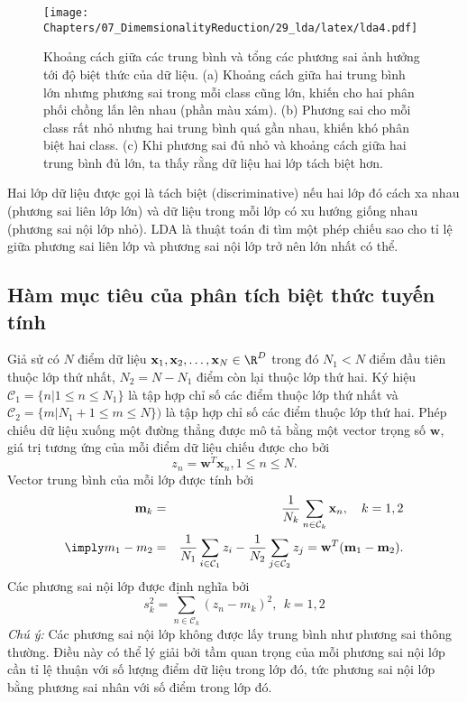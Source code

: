 \begin{figure}[t]
    \centering
        \texttt{[image: Chapters/07\_DimemsionalityReduction/29\_lda/latex/lda4.pdf]}
        \caption[]{Khoảng cách giữa các trung bình và tổng các phương sai ảnh hưởng
        tới độ biệt thức của dữ liệu. (a) Khoảng cách giữa hai trung bình
        lớn nhưng phương sai trong mỗi class cũng lớn, khiến cho hai phân phối
        chồng lấn lên nhau (phần màu xám). (b) Phương sai cho mỗi class rất nhỏ
        nhưng hai trung bình quá gần nhau, khiến khó phân biệt hai class. (c) Khi
        phương sai đủ nhỏ và khoảng cách giữa hai trung bình đủ lớn, ta thấy rằng dữ
        liệu hai lớp tách biệt hơn.}
        \label{fig:29_2}
   \end{figure} 
Hai lớp dữ liệu được gọi là {tách biệt} (discriminative) nếu hai lớp đó cách xa nhau
(phương sai liên lớp lớn) và dữ liệu trong mỗi lớp có xu hướng giống nhau
(phương sai nội lớp nhỏ). LDA là thuật toán đi tìm một phép chiếu sao cho tỉ
lệ giữa phương sai liên lớp và phương sai nội lớp trở nên lớn
nhất có thể.
 
 
\subsection{Hàm mục tiêu của phân tích biệt thức tuyến tính}
Giả sử có $N$ điểm dữ liệu $\mathbf{x}_1, \mathbf{x}_2, \dots,
\mathbf{x}_N \in \R^D$ trong đó $N_1 < N$ điểm đầu tiên thuộc lớp thứ nhất,
$N_2 = N - N_1$ điểm còn lại thuộc lớp thứ hai. Ký hiệu $\mathcal{C}_1 = \{n | 1
\leq n \leq N_1\}$ là tập hợp chỉ số các điểm thuộc lớp thứ nhất và
$\mathcal{C}_2 = \{m| N_1 + 1 \leq m \leq N\})$ là tập hợp  chỉ số các
điểm thuộc lớp thứ hai. Phép chiếu dữ liệu xuống một đường thẳng được mô
tả bằng một vector trọng số $\mathbf{w}$, giá trị tương ứng của mỗi điểm dữ liệu
chiếu được cho bởi
\begin{equation} 
z_n = \mathbf{w}^T\mathbf{x}_n, 1 \leq n \leq N.
\end{equation} 
Vector trung bình của mỗi lớp được tính bởi  
\begin{eqnarray} 
\label{eqn:29_1}
\mathbf{m}_k &=& \frac{1}{N_k}\sum_{n \in \mathcal{C}_k}\mathbf{x}_n,~~~ k = 1,
2 \\
\label{eqn:29_2}
\imply m_1 - m_2 &=& \frac{1}{N_1}\sum_{i \in \mathcal{C}_1}z_i -
\frac{1}{N_2}\sum_{j \in \mathcal{C}_2}z_j =  \mathbf{w}^T(\mathbf{m}_1 - \mathbf{m}_2).
\end{eqnarray} 
Các phương sai nội lớp được định nghĩa bởi
\begin{equation} 
\label{eqn:29_3}
s_k^2 = \sum_{n \in \mathcal{C}_k} (z_n - m_k)^2, ~~ k = 1, 2 
\end{equation} 
\textit{Chú ý:} Các phương sai nội lớp không được lấy trung bình như
phương sai thông thường. Điều này có thể lý giải bởi tầm quan trọng của mỗi
phương sai nội lớp cần tỉ lệ thuận với số lượng điểm dữ liệu trong lớp đó,
tức phương sai nội lớp bằng phương sai nhân với số điểm trong lớp đó.
 
